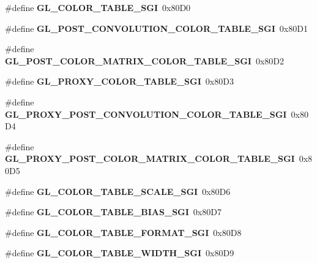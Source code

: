\begin{DoxyCompactItemize}
\item 
\#define {\bfseries G\+L\+\_\+\+C\+O\+L\+O\+R\+\_\+\+T\+A\+B\+L\+E\+\_\+\+S\+G\+I}~0x80\+D0\label{_s_d_l__opengl_8h_ac61699d1c6a5a099915c412d0b58d3a7}

\item 
\#define {\bfseries G\+L\+\_\+\+P\+O\+S\+T\+\_\+\+C\+O\+N\+V\+O\+L\+U\+T\+I\+O\+N\+\_\+\+C\+O\+L\+O\+R\+\_\+\+T\+A\+B\+L\+E\+\_\+\+S\+G\+I}~0x80\+D1\label{_s_d_l__opengl_8h_a09b23236bbe6a3531ed284fdae19b5cd}

\item 
\#define {\bfseries G\+L\+\_\+\+P\+O\+S\+T\+\_\+\+C\+O\+L\+O\+R\+\_\+\+M\+A\+T\+R\+I\+X\+\_\+\+C\+O\+L\+O\+R\+\_\+\+T\+A\+B\+L\+E\+\_\+\+S\+G\+I}~0x80\+D2\label{_s_d_l__opengl_8h_a9e82e05b12f4729b49f58b1c7bee0bdb}

\item 
\#define {\bfseries G\+L\+\_\+\+P\+R\+O\+X\+Y\+\_\+\+C\+O\+L\+O\+R\+\_\+\+T\+A\+B\+L\+E\+\_\+\+S\+G\+I}~0x80\+D3\label{_s_d_l__opengl_8h_a80cf9963a640aeff648e78fd24d1b5c8}

\item 
\#define {\bfseries G\+L\+\_\+\+P\+R\+O\+X\+Y\+\_\+\+P\+O\+S\+T\+\_\+\+C\+O\+N\+V\+O\+L\+U\+T\+I\+O\+N\+\_\+\+C\+O\+L\+O\+R\+\_\+\+T\+A\+B\+L\+E\+\_\+\+S\+G\+I}~0x80\+D4\label{_s_d_l__opengl_8h_abe33d39da160e4e4b14dc6a25bc7f525}

\item 
\#define {\bfseries G\+L\+\_\+\+P\+R\+O\+X\+Y\+\_\+\+P\+O\+S\+T\+\_\+\+C\+O\+L\+O\+R\+\_\+\+M\+A\+T\+R\+I\+X\+\_\+\+C\+O\+L\+O\+R\+\_\+\+T\+A\+B\+L\+E\+\_\+\+S\+G\+I}~0x80\+D5\label{_s_d_l__opengl_8h_ac71cef47057695edf71a274ce1e7135f}

\item 
\#define {\bfseries G\+L\+\_\+\+C\+O\+L\+O\+R\+\_\+\+T\+A\+B\+L\+E\+\_\+\+S\+C\+A\+L\+E\+\_\+\+S\+G\+I}~0x80\+D6\label{_s_d_l__opengl_8h_a41d6f6af001ccd634c487e2b92980d37}

\item 
\#define {\bfseries G\+L\+\_\+\+C\+O\+L\+O\+R\+\_\+\+T\+A\+B\+L\+E\+\_\+\+B\+I\+A\+S\+\_\+\+S\+G\+I}~0x80\+D7\label{_s_d_l__opengl_8h_a92ae56459d4533c9e90ae5c63903f7de}

\item 
\#define {\bfseries G\+L\+\_\+\+C\+O\+L\+O\+R\+\_\+\+T\+A\+B\+L\+E\+\_\+\+F\+O\+R\+M\+A\+T\+\_\+\+S\+G\+I}~0x80\+D8\label{_s_d_l__opengl_8h_a905c13639d320b93c084df3b49d44cac}

\item 
\#define {\bfseries G\+L\+\_\+\+C\+O\+L\+O\+R\+\_\+\+T\+A\+B\+L\+E\+\_\+\+W\+I\+D\+T\+H\+\_\+\+S\+G\+I}~0x80\+D9\label{_s_d_l__opengl_8h_a1be5c448fbe5ad596fff9ad6b40e4419}


\end{DoxyCompactItemize}
